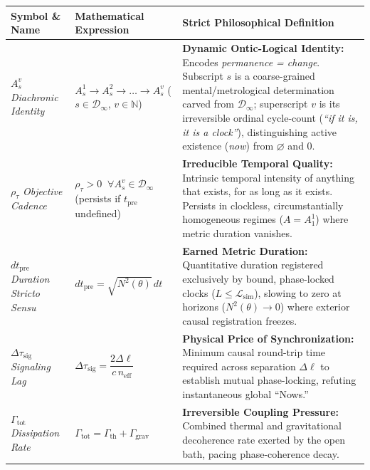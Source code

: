 \documentclass[11pt,a4paper]{article}
\begin{document}
\begin{table}[htbp]
\centering
\small
\renewcommand{\arraystretch}{1.35}
\begin{tabularx}{\textwidth}{>{\raggedright\arraybackslash}p{2.9cm} >{\raggedright\arraybackslash}p{4.3cm} >{\raggedright\arraybackslash}X}
\toprule
\textbf{Symbol \& Name} & \textbf{Mathematical Expression} & \textbf{Strict Philosophical Definition} \\
\midrule
\textbf{$A_s^v$} \newline \emph{Diachronic Identity} & $A_s^1 \to A_s^2 \to \dots \to A_s^v$ \newline ($s \in \mathcal{D}_\infty$, $v \in \mathbb{N}$) & \textbf{Dynamic Ontic-Logical Identity:} Encodes \emph{permanence = change}. Subscript $s$ is a coarse-grained mental/metrological determination carved from $\mathcal{D}_\infty$; superscript $v$ is its irreversible ordinal cycle-count (\emph{``if it is, it is a clock''}), distinguishing active existence (\emph{now}) from $\varnothing$ and $0$. \\
\textbf{$\rho_\tau$} \newline \emph{Objective Cadence} & $\rho_\tau > 0 \;\; \forall A_s^v \in \mathcal{D}_\infty$ \newline (persists if $t_{\mathrm{pre}}$ undefined) & \textbf{Irreducible Temporal Quality:} Intrinsic temporal intensity of anything that exists, for as long as it exists. Persists in clockless, circumstantially homogeneous regimes ($A = A_1^1$) where metric duration vanishes. \\
\textbf{$dt_{\mathrm{pre}}$} \newline \emph{Duration Stricto Sensu} & $dt_{\mathrm{pre}} = \sqrt{N^2(\theta)} \, dt$ & \textbf{Earned Metric Duration:} Quantitative duration registered exclusively by bound, phase-locked clocks ($L \le \mathcal{L}_{\mathrm{sim}}$), slowing to zero at horizons ($N^2(\theta) \to 0$) where exterior causal registration freezes. \\
\textbf{$\Delta\tau_{\mathrm{sig}}$} \newline \emph{Signaling Lag} & $\Delta\tau_{\mathrm{sig}} = \dfrac{2\Delta\ell}{c \, n_{\mathrm{eff}}}$ & \textbf{Physical Price of Synchronization:} Minimum causal round-trip time required across separation $\Delta\ell$ to establish mutual phase-locking, refuting instantaneous global ``Nows.'' \\
\textbf{$\Gamma_{\mathrm{tot}}$} \newline \emph{Dissipation Rate} & $\Gamma_{\mathrm{tot}} = \Gamma_{\mathrm{th}} + \Gamma_{\mathrm{grav}}$ & \textbf{Irreversible Coupling Pressure:} Combined thermal and gravitational decoherence rate exerted by the open bath, pacing phase-coherence decay. \\

\end{tabularx}
\end{table}
\end{document}
